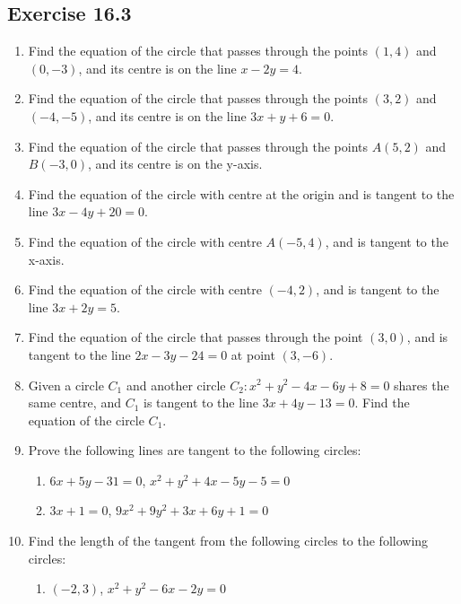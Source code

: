 \documentclass{report}
\begin{document}
\begin{multicols}{2}
    \subsection{Exercise 16.3}

    \begin{enumerate}
        \item Find the equation of the circle that passes through the points $(1, 4)$ and
              $(0, -3)$, and its centre is on the line $x - 2y = 4$.
        \item Find the equation of the circle that passes through the points $(3, 2)$ and
              $(-4, -5)$, and its centre is on the line $3x + y + 6 = 0$.
        \item Find the equation of the circle that passes through the points $A(5, 2)$ and
              $B(-3, 0)$, and its centre is on the y-axis.
        \item Find the equation of the circle with centre at the origin and is tangent to the
              line $3x - 4y + 20 = 0$.
        \item Find the equation of the circle with centre $A(-5, 4)$, and is tangent to the
              x-axis.
        \item Find the equation of the circle with centre $(-4, 2)$, and is tangent to the
              line $3x + 2y = 5$.
        \item Find the equation of the circle that passes through the point $(3, 0)$, and is
              tangent to the line $2x - 3y - 24 = 0$ at point $(3, -6)$.
        \item Given a circle $C_1$ and another circle $C_2: x^2 + y^2 - 4x - 6y + 8 = 0$
              shares the same centre, and $C_1$ is tangent to the line $3x + 4y - 13 = 0$.
              Find the equation of the circle $C_1$.
        \item Prove the following lines are tangent to the following circles:
              \begin{enumerate}
                  \item $6x + 5y - 31 = 0$, $x^2 + y^2 + 4x - 5y - 5 = 0$
                  \item $3x + 1 = 0$, $9x^2 + 9y^2 + 3x + 6y + 1 = 0$
              \end{enumerate}
        \item Find the length of the tangent from the following circles to the following
              circles:
              \begin{enumerate}
                  \item $(-2, 3)$, $x^2 + y^2 - 6x - 2y = 0$

\end{enumerate}
\end{enumerate}
\end{multicols}
\end{document}
